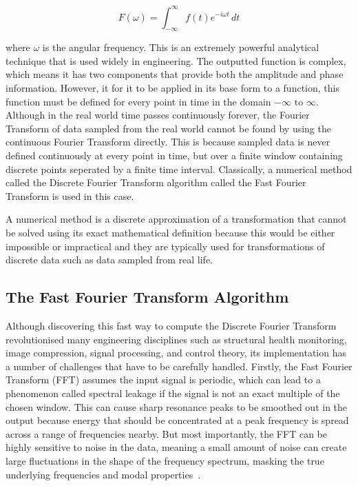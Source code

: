 \documentclass[12pt]{article}
\begin{document}
    \begin{equation}
        F(\omega) = \int_{-\infty}^{\infty} f(t) e^{-i \omega t} \, dt\label{eq:ft}
    \end{equation}


    \noindent where $\omega$ is the angular frequency.
    This is an extremely powerful analytical technique that is used widely in engineering.
    The outputted function is complex, which means it has two components that provide both the amplitude and phase information.
    However, it for it to be applied in its base form to a function, this function must be defined for every point in time in the domain $-\infty \text{ to } \infty$.
    Although in the real world time passes continuously forever, the Fourier Transform of data sampled from the real world cannot be found by using the continuous Fourier Transform directly.
    This is because sampled data is never defined continuously at every point in time, but over a finite window containing discrete points seperated by a finite time interval.
    Classically, a numerical method called the Discrete Fourier Transform algorithm called the Fast Fourier Transform is used in this case.

    A numerical method is a discrete approximation of a transformation that cannot be solved using its exact mathematical definition because this would be either impossible or impractical and they are typically used for transformations of discrete data such as data sampled from real life.

    \subsection{The Fast Fourier Transform Algorithm}
    Although discovering this fast way to compute the Discrete Fourier Transform revolutionised many engineering disciplines such as structural health monitoring, image compression, signal processing, and control theory\cite{Byjus2023}, its implementation has a number of challenges that have to be carefully handled.
    Firstly, the Fast Fourier Transform (FFT) assumes the input signal is periodic, which can lead to a phenomenon called spectral leakage if the signal is not an exact multiple of the chosen window\cite{MathStackExchange2023}.
    This can cause sharp resonance peaks to be smoothed out in the output because energy that should be concentrated at a peak frequency is spread across a range of frequencies nearby.
    But most importantly, the FFT can be highly sensitive to noise in the data, meaning a small amount of noise can create large fluctuations in the shape of the frequency spectrum, masking the true underlying frequencies and modal properties~\cite{MathStackExchange2023}.
\end{document}
